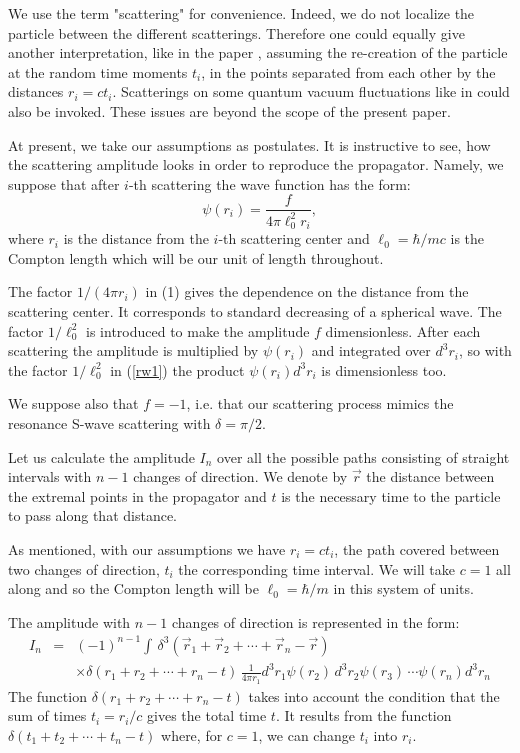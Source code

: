 \documentclass[a4paper,12pt]{article}
\begin{document}
We use the term "scattering" for convenience. Indeed, we do not localize the
particle between the different scatterings. Therefore one could equally give
another interpretation, like in the paper \cite{Kirilyuk00}, assuming the
re-creation of the  particle at the random time moments $t_i$, in  the points
separated from each other by the distances $r_i=ct_i$. Scatterings on
some quantum
vacuum fluctuations like in \cite{Nelson84} could also be invoked.
These issues are beyond  the scope of the present paper.


At present, we take our assumptions as postulates. It is instructive
to see, how the scattering
amplitude looks  in order to reproduce the propagator. Namely, we suppose
that after $i$-th scattering the wave function has the form:
\begin{equation}\label{rw1}
\psi(r_i)=\frac{f}{4\pi \ell_0^2 r_{i}},
\end{equation}
where $r_{i}$ is the distance from the $i$-th scattering center
and $\ell_0=\hbar/m c$ is the Compton length which will be our unit of length
throughout.

The factor $1/(4 \pi r_{i})$ in (1) gives the dependence on the
distance from the scattering center. It corresponds to standard
decreasing of a spherical wave. The factor $1/\ell_0^2$ is
introduced to make the amplitude $f$ dimensionless.
After each scattering the amplitude is  multiplied by $\psi(r_i)$
and integrated over $d^3r_i$, so with the factor $1/\ell_0^2$ in
(\ref{rw1}) the product $\psi(r_i) d^3r_i$ is dimensionless too.

We suppose also that $f=-1$, i.e. that our scattering process
mimics the resonance S-wave scattering with $\delta=\pi/2$.

Let us calculate  the amplitude $I_{n}$ over all the possible
paths consisting of straight intervals with $n-1$ changes of
direction. We denote by $\vec{r}$ the distance between the
extremal points in the propagator and $t$ is the necessary time to
the particle to pass along that distance.

As mentioned, with our assumptions we have $r_{i} = c t_{i}$, the path covered
between two changes of direction, $t_{i}$ the corresponding time interval. We
will take $c=1$ all along and so the Compton length will be $\ell_{0}=\hbar/m$
in this system of units.

The amplitude with $n-1$ changes of direction is represented in the form:
\begin{eqnarray}\label{rw2}
I_{n}&=&(-1)^{n-1}\int\,\delta^{3}\left(\vec{r}_{1} + \vec{r}_{2} +
\cdots +\vec{r}_{n}-\vec{r}\right)
\nonumber\\
&&\times\delta(r_{1} + r_{2} + \cdots + r_{n}-t)\,\frac{1}{4\pi r_1}
d^{3}r_{1}\psi(r_2)\,
d^{3}r_{2}\psi(r_3) \,
\cdots
\psi(r_n) d^{3}r_{n}
\end{eqnarray}
The function $\delta(r_{1} + r_{2} + \cdots + r_{n}-t)$ takes into
account the condition  that the sum of times $t_i=r_i/c$ gives the
total time $t$. It results from the function $\delta(t_{1} + t_{2}
+ \cdots + t_{n}-t)$ where, for $c=1$, we can change $t_{i}$ into
$r_i$.
\end{document}
